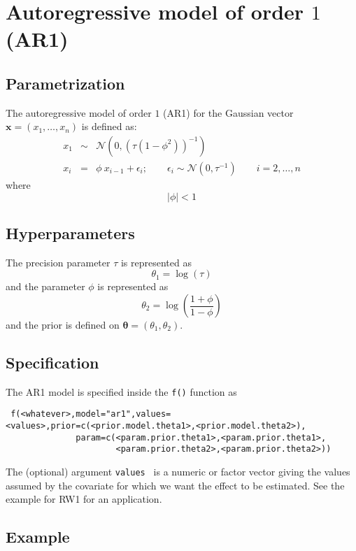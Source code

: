 \documentclass[a4paper,11pt]{article}
\begin{document}
\section*{Autoregressive model of order $1$ (AR1)}

\subsection*{Parametrization}

The autoregressive model of order $1$ (AR1) for the Gaussian vector $\mathbf{x}=(x_1,\dots,x_n)$ is defined as:
\begin{eqnarray}\nonumber
x_1&\sim&\mathcal{N}(0,(\tau(1-\phi^2))^{-1}) \\\nonumber
x_i&=&\phi\ x_{i-1}+\epsilon_i; \qquad \epsilon_i\sim\mathcal{N}(0,\tau^{-1}) \qquad  i=2,\dots,n
\end{eqnarray}
where
\[
|\phi|<1
\]

\subsection*{Hyperparameters}

The precision parameter $\tau$ is represented as
\begin{displaymath}
    \theta_1 =\log(\tau) 
\end{displaymath}
and the parameter $\phi$ is represented as
\[
\theta_2 = \log\left(\frac{1+\phi}{1-\phi}\right)
\]
and the prior is defined on $\mathbf{\theta}=(\theta_1,\theta_2)$. 

\subsection*{Specification}

The AR1 model is specified inside the {\tt f()} function as
\begin{verbatim}
 f(<whatever>,model="ar1",values=<values>,prior=c(<prior.model.theta1>,<prior.model.theta2>),
              param=c(<param.prior.theta1>,<param.prior.theta1>,
                      <param.prior.theta2>,<param.prior.theta2>))
\end{verbatim}
The (optional) argument {\tt values } is a numeric or factor vector giving the values assumed by the covariate for
 which we want the effect to be estimated. See the example for RW1 for an application. 

\subsection*{Example}
\end{document}

